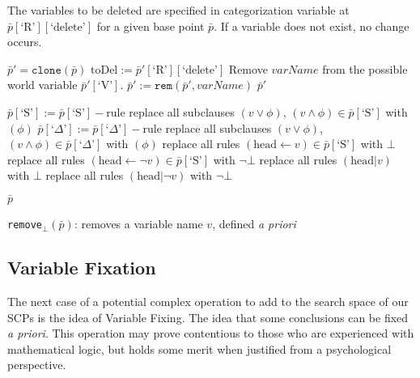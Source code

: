The variables to be deleted are specified in categorization variable at $\bar{p}[\text{`R'}][\text{`delete'}]$ for a given base point $\bar{p}$. If a variable does not exist, no change occurs.

\begin{algorithm}[H] 
\SetAlgoLined
{}
{
$\bar{p}'=\texttt{clone}(\bar{p})$\;
$\text{toDel}:=\bar{p}'[\text{`R'}][\text{`delete'}]$\;
{
Remove $\textit{varName}$ from the possible world variable $\bar{p}'[\text{`V'}]$.\;
$\bar{p}':=\texttt{rem}(\bar{p}', \textit{varName})$\;
}
\Return $\bar{p}'$
}

{
{
{
$\bar{p}[\textrm{`S'}]:=\bar{p}[\textrm{`S'}]-\text{rule}$\;
}
{
replace all subclauses $(v \lor \phi)$, $(v \land \phi)\in \bar{p}[\textrm{`S'}]$ with $(\phi)$\;
}
}
{
{
$\bar{p}[\textrm{`}\Delta\textrm{'}]:=\bar{p}[\textrm{`}\Delta\textrm{'}] - \text{rule}$\;
}
{
replace all subclauses $(v \lor \phi)$, $(v \land \phi)\in \bar{p}[\textrm{`}\Delta\textrm{'}]$ with $(\phi)$\;
}
}
replace all rules $(\text{head} \leftarrow v) \in \bar{p}[\textrm{`S'}]$ with $\bot$\;
replace all rules $(\text{head} \leftarrow \lnot v) \in \bar{p}[\textrm{`S'}]$ with $\lnot \bot$\;
replace all rules $(\text{head}|v)$ with $\bot$\;
replace all rules $(\text{head}|\lnot v)$ with $\lnot \bot$\;

\Return $\bar{p}$
}

\caption{\texttt{remove}$_\bot(\bar{p})$: removes a variable name $v$, defined \textit{a priori}}
\label{cogOp:removeuV}
\end{algorithm}
\subsection{Variable Fixation} \label{ssec:variableFixing}
The next case of a potential complex operation to add to the search space of our SCPs is the idea of Variable Fixing. The idea that some  conclusions can be fixed \textit{a priori}. This operation may prove contentious to those who are experienced with mathematical logic, but holds some merit when justified from a psychological perspective. 

